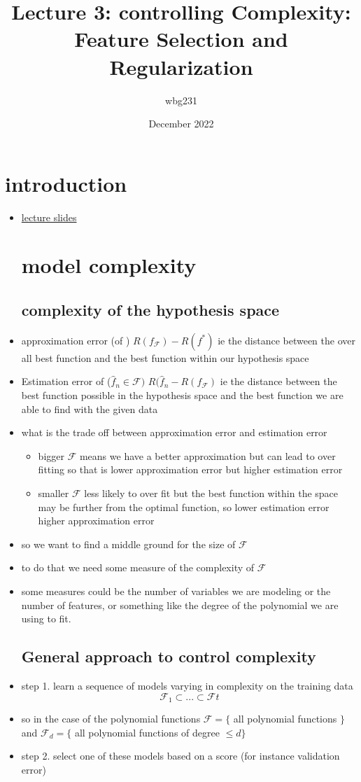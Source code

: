 \documentclass{article}
\title{Lecture 3: controlling Complexity: Feature Selection and Regularization}
\author{wbg231 }
\date{December 2022}
\begin{document}
\maketitle

\section*{introduction}
\begin{itemize}
\item \href{https://nyu-ds1003.github.io/mlcourse/2023/lectures/lec03/03-handout.pdf}{lecture slides}
\section{model complexity}
\subsection{complexity of the hypothesis space}
\item approximation error (of ) $R(f_{\mathcal{F}})-R(f^{*})$ ie the distance between the over all best function and the best function within our hypothesis space
\item Estimation error of ($\hat{f}_{n} \in \mathcal{F})$ $R(\hat{f}_{n}-R(f_{\mathcal{F}})$ ie the distance between the best function possible in the hypothesis space and the best function we are able to find with the given data
\item what is the trade off between approximation error and estimation error 
\begin{itemize}
    \item bigger $\mathcal{F}$ means we have a better approximation but can lead to over fitting so that is lower approximation error but higher estimation error 
    \item smaller $\mathcal{F}$ less likely to over fit but the best function within the space may be further from the optimal function, so lower estimation error higher approximation error
\end{itemize}
\item so we want to find a middle ground for the size of $\mathcal{F}$
\item to do that we need some measure of the complexity of $\mathcal{F}$
\item some measures could be the number of variables we are modeling or the number of features, or something like the degree of the polynomial we are using to fit. 
\subsection{General approach to control complexity}
\item step 1. learn a sequence of models varying in complexity on the training data $$\mathcal{F}_1\subset ... \subset \mathcal{F}t$$
\item so in the case of the polynomial functions $\mathcal{F}=\{$ all polynomial functions $\}$ and $\mathcal{F}_d=\{$ all polynomial functions of degree $\leq d\}$ 
\item step 2. select one of these models based on a score (for instance validation error)

\end{itemize}
\end{document}
